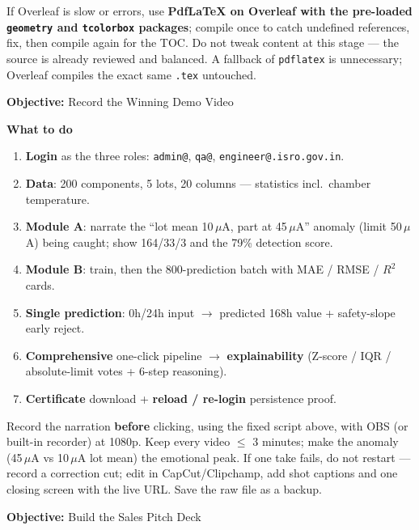 \documentclass[11pt,a4paper]{article}
\newcommand{\code}[1]{\texttt{\small #1}}
\newcommand{\solution}[1]{\par\vspace{0.4em}\noindent
  \begin{tcolorbox}[colback=solgreen!8,colframe=solgreen,
    title={\sffamily\bfseries\color{white}The Solution},arc=2pt,boxrule=1pt] #1 \end{tcolorbox}\par\vspace{0.6em}}
\newcommand{\phasebox}[3]{\par\vspace{0.8em}\noindent
  \begin{tcolorbox}[colback=isroblue!6,colframe=isroblue,
    title={\sffamily\bfseries\color{white}#1 \quad (#2)},arc=2pt,boxrule=1.2pt]
    \textbf{Objective:} #3%
  \end{tcolorbox}\par\vspace{0.4em}}
\begin{document}
\solution{
  If Overleaf is slow or errors, use \textbf{PdfLaTeX on Overleaf with the pre-loaded
  \texttt{geometry} and \texttt{tcolorbox} packages}; compile once to catch undefined
  references, fix, then compile again for the TOC. Do not tweak content at this stage ---
  the source is already reviewed and balanced. A fallback of \code{pdflatex} is unnecessary;
  Overleaf compiles the exact same \code{.tex} untouched.
}

\phasebox{Phase 2}{Hours 3--7}{Record the Winning Demo Video}

\textbf{What to do}
\begin{enumerate}[leftmargin=1.5em]
  \item \textbf{Login} as the three roles: \code{admin@}, \code{qa@},
        \code{engineer@}\code{.isro.gov.in}.
  \item \textbf{Data}: 200 components, 5 lots, 20 columns --- statistics incl.\ chamber temperature.
  \item \textbf{Module A}: narrate the ``lot mean 10\,$\mu$A, part at 45\,$\mu$A'' anomaly
        (limit 50\,$\mu$A) being caught; show 164/33/3 and the 79\% detection score.
  \item \textbf{Module B}: train, then the 800-prediction batch with MAE / RMSE / $R^2$ cards.
  \item \textbf{Single prediction}: 0h/24h input $\rightarrow$ predicted 168h value +
        safety-slope early reject.
  \item \textbf{Comprehensive} one-click pipeline $\rightarrow$ \textbf{explainability}
        (Z-score / IQR / absolute-limit votes + 6-step reasoning).
  \item \textbf{Certificate} download + \textbf{reload / re-login} persistence proof.
\end{enumerate}

\solution{
  Record the narration \textbf{before} clicking, using the fixed script above, with OBS
  (or built-in recorder) at 1080p. Keep every video $\le$ 3 minutes; make the anomaly
  (45\,$\mu$A vs 10\,$\mu$A lot mean) the emotional peak. If one take fails, do not restart
  --- record a correction cut; edit in CapCut/Clipchamp, add shot captions and one closing
  screen with the live URL. Save the raw file as a backup.
}

\phasebox{Phase 3}{Hours 7--10}{Build the Sales Pitch Deck}
\end{document}
